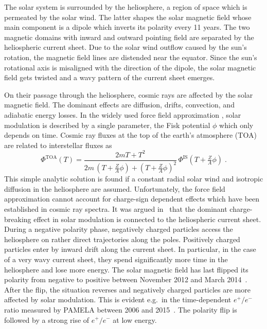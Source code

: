 \documentclass[a4paper,11pt]{article}
\begin{document}
The solar system is surrounded by the heliosphere, a region of space which is permeated by the solar wind. The latter shapes the solar magnetic field whose main component is a dipole which inverts its polarity every 11 years. The two magnetic domains with inward and outward pointing field are separated by the heliospheric current sheet. Due to the solar wind outflow caused by the sun's rotation, the magnetic field lines are distended near the equator.  Since the sun's rotational axis is misaligned with the direction of the dipole, the solar magnetic field gets twisted and a wavy pattern of the current sheet emerges.

On their passage through the heliosphere, cosmic rays are affected by the solar magnetic field. The dominant effects are diffusion, drifts, convection, and adiabatic energy losses. In the widely used force field approximation \cite{Gleeson:1968zza}, solar modulation is described by a single parameter, the Fisk potential $\phi$ which only depends on time. Cosmic ray fluxes at the top of the earth's atmosphere (TOA) are related to interstellar fluxes as
\begin{equation}\label{eq:forcefield}
 \Phi^\text{TOA}(T) = \frac{2m T+T^2}{ 
2m \,(T+\frac{Z}{A}\phi)+(T+\frac{Z}{A}\phi)^2}\,\Phi^\text{IS}(T+\tfrac{Z}{A}\phi)\;. 
\end{equation}
This simple analytic solution is found if a constant radial solar wind and isotropic diffusion in the heliosphere are assumed. Unfortunately, the force field approximation cannot account for charge-sign dependent effects which have been established in cosmic ray spectra. It was argued in~\cite{Kota:1979,Jokipii:1981} that the dominant charge-breaking effect in solar modulation is connected to the heliospheric current sheet. During a negative polarity phase, negatively charged particles access the heliosphere on rather direct trajectories along the poles. Positively charged particles enter by inward drift along the current sheet. In particular, in the case of a very wavy current sheet, they spend significantly more time in the heliosphere and lose more energy. The solar magnetic field has last flipped its polarity from negative to positive between November 2012 and March 2014~\cite{Sun:2015}. After the flip, the situation reverses and negatively charged particles are more affected by solar modulation. This is evident e.g.\ in the time-dependent $e^+/e^-$ ratio measured by PAMELA between 2006 and 2015~\cite{Adriani:2016uhu}. The polarity flip is followed by a strong rise of $e^+/e^-$ at low energy.
\end{document}
